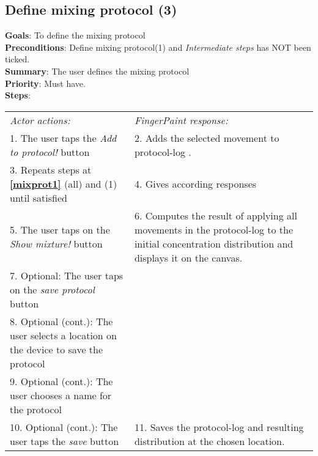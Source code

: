 \begin{appendices}
 \section{Define mixing protocol (3)}
  \label{mixprot3}
  \textbf{Goals}: To define the mixing protocol\\
  \textbf{Preconditions}: Define mixing protocol(1) and \emph{Intermediate steps} has NOT been ticked.\\
  \textbf{Summary}: The user defines the mixing protocol\\
  \textbf{Priority}: Must have.\\
  \textbf{Steps}: \\
  \begin{tabular}{ p{} p{} }
  	\emph{Actor actions:} & \emph{FingerPaint response:} \\
    1.	The user taps the \emph{Add to protocol!} button	& 2.	Adds the selected movement to protocol-log . \\
    3.	Repeats steps at \textbf{\ref{mixprot1}} (all) and (1) until satisfied	& 4.	Gives according responses\\
    5.	The user taps on the \emph{Show mixture!} button	& 6.	Computes the result of applying all movements in the protocol-log to the initial concentration distribution and displays it on the canvas.\\
    7.	Optional: The user taps on the \emph{save protocol} button & \\
    8. Optional (cont.): The user selects a location on the device to save the protocol & \\
    9. Optional (cont.): The user chooses a name for the protocol & \\
    10. Optional (cont.): The user taps the \emph{save} button &  11. Saves the protocol-log and resulting distribution at the chosen location. \\
  \end{tabular}
\end{appendices}
